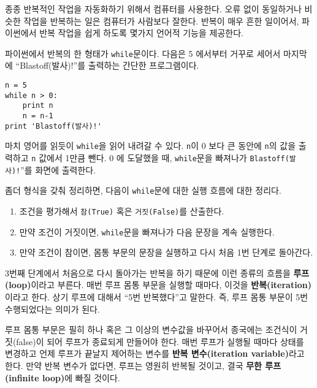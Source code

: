 종종 반복적인 작업을 자동화하기 위해서 컴퓨터를 사용한다. 
오류 없이 동일하거나 비슷한 작업을 반복하는 일은 컴퓨터가 사람보다 잘한다.
반복이 매우 흔한 일이어서, 파이썬에서 반복 작업을 쉽게 하도록 몇가지 언어적 기능을 제공한다.

파이썬에서 반복의 한 형태가 {\tt while}문이다.
다음은 5 에서부터 거꾸로 세어서 마지막에 ``Blastoff(발사)!''를 출력하는 간단한 프로그램이다.

\beforeverb
\begin{verbatim}
n = 5
while n > 0:
    print n
    n = n-1
print 'Blastoff(발사)!'
\end{verbatim}
\afterverb
%

마치 영어를 읽듯이 {\tt while}을 읽어 내려갈 수 있다. 
{\tt n}이 0 보다 큰 동안에 {\tt n}의 값을 출력하고 {\tt n} 값에서 1만큼 뺀다. 
0 에 도달했을 때, {\tt while}문을 빠져나가 {\tt Blastoff(발사)!}''를 화면에 출력한다.


좀더 형식을 갖춰 정리하면, 다음이 {\tt while}문에 대한 실행 흐름에 대한 정리다.

\begin{enumerate}

\item 조건을 평가해서 {\tt 참(True)} 혹은 {\tt 거짓(False)}를 산출한다.

\item 만약 조건이 거짓이면, {\tt while}문을 빠져나가 다음 문장을 계속 실행한다.

\item 만약 조건이 참이면, 몸통 부문의 문장을 실행하고 다시 처음 1번 단계로 돌아간다.

\end{enumerate}

3번째 단계에서 처음으로 다시 돌아가는 반복을 하기 때문에 이런 종류의 흐름을 {\bf 루프(loop)}이라고 부른다.
매번 루프 몸통 부문을 실행할 때마다, 이것을 {\bf 반복(iteration)}이라고 한다. 
상기 루프에 대해서 ``5번 반복했다''고 말한다. 
즉, 루프 몸통 부문이 5번 수행되었다는 의미가 된다.


루프 몸통 부문은 필히 하나 혹은 그 이상의 변수값을 바꾸어서 
종국에는 조건식이 거짓(false)이 되어 루프가 종료되게 만들어야 한다.
매번 루프가 실행될 때마다 상태를 변경하고 언제 루프가 끝날지 제어하는 변수를 {\bf 반복 변수(iteration variable)}라고 한다.
만약 반복 변수가 없다면, 루프는 영원히 반복될 것이고, 결국 {\bf 무한 루프(infinite loop)}에 빠질 것이다.

